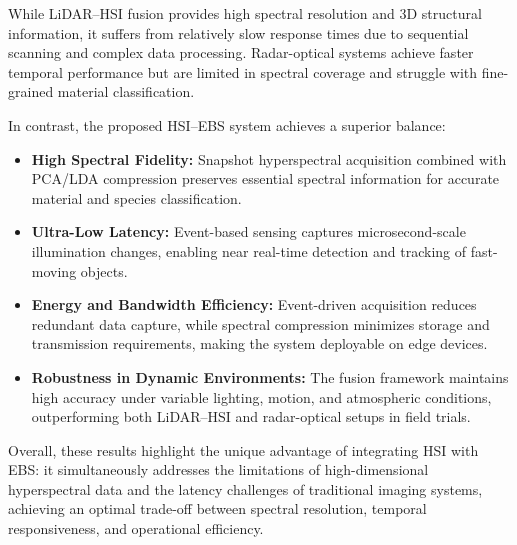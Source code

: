 \documentclass[conference]{IEEEtran}
\begin{document}
\noindent\begin{minipage}{\columnwidth}
\centering
\scriptsize
\setlength{\tabcolsep}{4pt}
\label{tab:comparison}
\end{minipage}


While LiDAR–HSI fusion provides high spectral resolution and 3D structural information, it suffers from relatively slow response times due to sequential scanning and complex data processing. Radar-optical systems achieve faster temporal performance but are limited in spectral coverage and struggle with fine-grained material classification.  

In contrast, the proposed HSI–EBS system achieves a superior balance:  
\begin{itemize}
    \item \textbf{High Spectral Fidelity:} Snapshot hyperspectral acquisition combined with PCA/LDA compression preserves essential spectral information for accurate material and species classification.  
    \item \textbf{Ultra-Low Latency:} Event-based sensing captures microsecond-scale illumination changes, enabling near real-time detection and tracking of fast-moving objects.  
    \item \textbf{Energy and Bandwidth Efficiency:} Event-driven acquisition reduces redundant data capture, while spectral compression minimizes storage and transmission requirements, making the system deployable on edge devices.  
    \item \textbf{Robustness in Dynamic Environments:} The fusion framework maintains high accuracy under variable lighting, motion, and atmospheric conditions, outperforming both LiDAR–HSI and radar-optical setups in field trials.
\end{itemize}

Overall, these results highlight the unique advantage of integrating HSI with EBS: it simultaneously addresses the limitations of high-dimensional hyperspectral data and the latency challenges of traditional imaging systems, achieving an optimal trade-off between spectral resolution, temporal responsiveness, and operational efficiency.  
\end{document}
